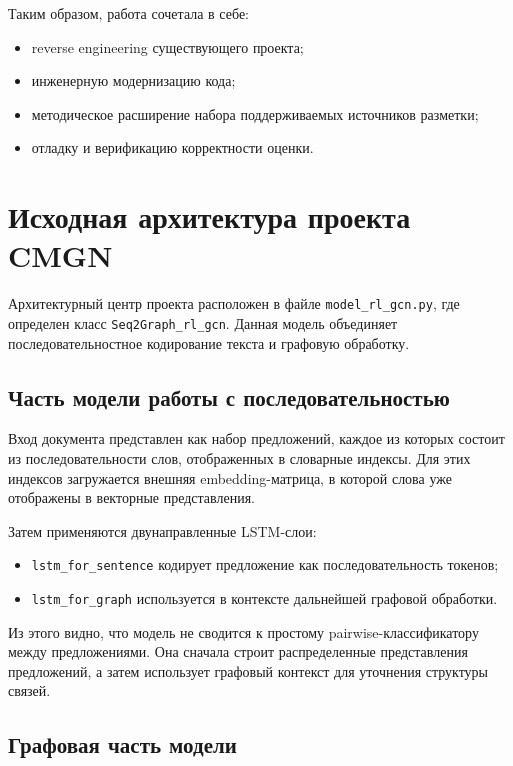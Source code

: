\documentclass[12pt,a4paper]{article}
\begin{document}
Таким образом, работа сочетала в себе:

\begin{itemize}
    \item reverse engineering существующего проекта;
    \item инженерную модернизацию кода;
    \item методическое расширение набора поддерживаемых источников разметки;
    \item отладку и верификацию корректности оценки.
\end{itemize}

\section{Исходная архитектура проекта CMGN}

Архитектурный центр проекта расположен в файле \texttt{model\_rl\_gcn.py}, где определен
класс \texttt{Seq2Graph\_rl\_gcn}. Данная модель объединяет последовательностное
кодирование текста и графовую обработку.

\subsection{Часть модели работы с последовательностью}

Вход документа представлен как набор предложений, каждое из которых состоит из
последовательности слов, отображенных в словарные индексы. Для этих индексов загружается
внешняя embedding-матрица, в которой слова уже отображены в векторные представления.

Затем применяются двунаправленные LSTM-слои:

\begin{itemize}
    \item \texttt{lstm\_for\_sentence} кодирует предложение как последовательность токенов;
    \item \texttt{lstm\_for\_graph} используется в контексте дальнейшей графовой обработки.
\end{itemize}

Из этого видно, что модель не сводится к простому pairwise-классификатору между
предложениями. Она сначала строит распределенные представления предложений, а затем
использует графовый контекст для уточнения структуры связей.

\subsection{Графовая часть модели}
\end{document}
